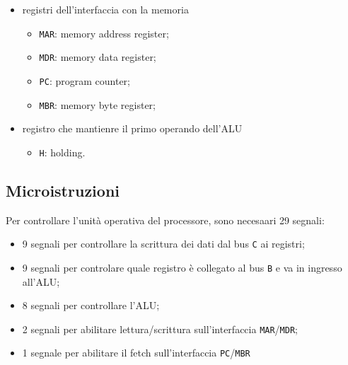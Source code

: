 \begin{itemize}
    \item registri dell'interfaccia con la memoria 
    \begin{itemize}
        \item \texttt{MAR}: memory address register;
        \item \texttt{MDR}: memory data register;
        \item \texttt{PC}: program counter;
        \item \texttt{MBR}: memory byte register;
    \end{itemize}
    \item registro che mantienre il primo operando dell'ALU
    \begin{itemize}
        \item \texttt{H}: holding.
    \end{itemize}
\end{itemize}

\subsection{Microistruzioni}
Per controllare l'unità operativa del processore, sono necesaari 29 segnali:
\begin{itemize}
    \item 9 segnali per controllare la scrittura dei dati dal bus \texttt{C} ai registri;
    \item 9 segnali per controlare quale registro è collegato al bus \texttt{B} e va in ingresso all'ALU;
    \item 8 segnali per controllare l'ALU;
    \item 2 segnali per abilitare lettura/scrittura sull'interfaccia \texttt{MAR}/\texttt{MDR};
    \item 1 segnale per abilitare il fetch sull'interfaccia \texttt{PC}/\texttt{MBR}
\end{itemize}

